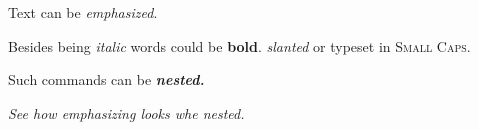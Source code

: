 \documentclass{article}
\begin{document}
  {\sffamily
    Text can be {\em emphasized}.

    Besides being {\itshape italic} words could be {\bfseries bold}.
    {\slshape slanted} or typeset in {\scshape Small Caps}.

    Such commands can be {\itshape \bfseries nested.}}

  {\em See how {\em emphasizing} looks whe nested.}
\end{document}
